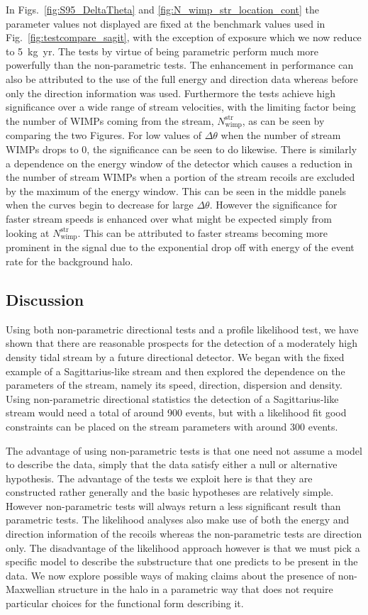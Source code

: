 In Figs.~\ref{fig:S95_DeltaTheta} and \ref{fig:N_wimp_str_location_cont} the parameter values not displayed are fixed at the benchmark values used in Fig.~\ref{fig:testcompare_sagit}, with the exception of exposure which we now reduce to 5~kg~yr. The tests by virtue of being parametric perform much more powerfully than the non-parametric tests. The enhancement in performance can also be attributed to the use of the full energy and direction data whereas before only the direction information was used. Furthermore the tests achieve high significance over a wide range of stream velocities, with the limiting factor being the number of WIMPs coming from the stream, $N_\textrm{wimp}^{\textrm{str}}$, as can be seen by comparing the two Figures. For low values of $\Delta\theta$ when the number of stream WIMPs drops to 0, the significance can be seen to do likewise. There is similarly a dependence on the energy window of the detector which causes a reduction in the number of stream WIMPs when a portion of the stream recoils are excluded by the maximum of the energy window. This can be seen in the middle panels when the curves begin to decrease for large $\Delta \theta$. However the significance for faster stream speeds is enhanced over what might be expected simply from looking at $N_\textrm{wimp}^\textrm{str}$. This can be attributed to faster streams becoming more prominent in the signal due to the exponential drop off with energy of the event rate for the background halo.

\subsection{Discussion}
Using both non-parametric directional tests and a profile likelihood test, we have shown that there are reasonable prospects for the detection of a moderately high density tidal stream by a future directional detector. We began with the fixed example of a Sagittarius-like stream and then explored the dependence on the parameters of the stream, namely its speed, direction, dispersion and density. Using non-parametric directional statistics the detection of a Sagittarius-like stream would need a total of around 900 events, but with a likelihood fit good constraints can be placed on the stream parameters with around 300 events.

The advantage of using non-parametric tests is that one need not assume a model to describe the data, simply that the data satisfy either a null or alternative hypothesis. The advantage of the tests we exploit here is that they are constructed rather generally and the basic hypotheses are relatively simple. However non-parametric tests will always return a less significant result than parametric tests. The likelihood analyses also make use of both the energy and direction information of the recoils whereas the non-parametric tests are direction only. The disadvantage of the likelihood approach however is that we must pick a specific model to describe the substructure that one predicts to be present in the data. We now explore possible ways of making claims about the presence of non-Maxwellian structure in the halo in a parametric way that does not require particular choices for the functional form describing it.

